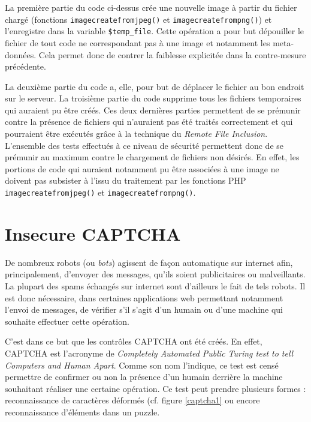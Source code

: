La première partie du code ci-dessus crée une nouvelle image à partir du fichier chargé (fonctions \texttt{imagecreatefromjpeg()} et \texttt{imagecreatefrompng()}) et l'enregistre dans la variable \texttt{\$temp\_file}. Cette opération a pour but dépouiller le fichier de tout code ne correspondant pas à une image et notamment les meta-données. Cela permet donc de contrer la faiblesse explicitée dans la contre-mesure précédente.

La deuxième partie du code a, elle, pour but de déplacer le fichier au bon endroit sur le serveur. La troisième partie du code supprime tous les fichiers temporaires qui auraient pu être créés. Ces deux dernières parties permettent de se prémunir contre la présence de fichiers qui n'auraient pas été traités correctement et qui pourraient être exécutés grâce à la technique du \textit{Remote File Inclusion}.\\

L'ensemble des tests effectués à ce niveau de sécurité permettent donc de se prémunir au maximum contre le chargement de fichiers non désirés. En effet, les portions de code qui auraient notamment pu être associées à une image ne doivent pas subsister à l'issu du traitement par les fonctions PHP \texttt{imagecreatefromjpeg()} et \texttt{imagecreatefrompng()}.

\section{Insecure CAPTCHA}

De nombreux robots (ou \textit{bots}) agissent de façon automatique sur internet afin, principalement, d'envoyer des messages, qu'ils soient publicitaires ou malveillants. La plupart des spams échangés sur internet sont d'ailleurs le fait de tels robots. Il est donc nécessaire, dans certaines applications web permettant notamment l'envoi de messages, de vérifier s'il s'agit d'un humain ou d'une machine qui souhaite effectuer cette opération.

C'est dans ce but que les contrôles CAPTCHA ont été créés. En effet, CAPTCHA est l'acronyme de \textit{Completely Automated Public Turing test to tell Computers and Human Apart}. Comme son nom l'indique, ce test est censé permettre de confirmer ou non la présence d'un humain derrière la machine souhaitant réaliser une certaine opération. Ce test peut prendre plusieurs formes : reconnaissance de caractères déformés (cf. figure \ref{captcha1} ou encore reconnaissance d'éléments dans un puzzle.

